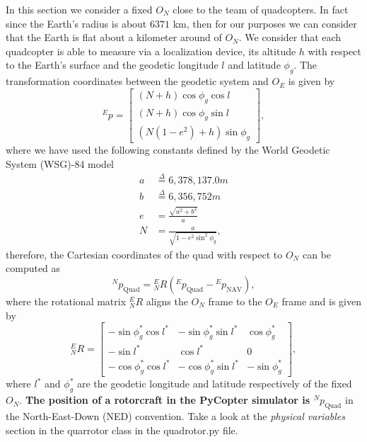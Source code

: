 \documentclass[a4paper, onecolumn]{ieeeconf}
\newcommand{\dfb}{\stackrel{\Delta}{=}}
\begin{document}
In this section we consider a fixed $O_N$ close to the team of quadcopters. In fact since the Earth's radius is about $6371$ km, then for our purposes we can consider that the Earth is flat about a kilometer around of $O_N$. We consider that each quadcopter is able to measure via a localization device, its altitude $h$ with respect to the Earth's surface and the geodetic longitude $l$ and latitude $\phi_g$. The transformation coordinates between the geodetic system and $O_E$ is given by
\begin{equation}
^Ep = \begin{bmatrix}(N+h)\cos{\phi_g}\cos{l} \\
(N+h)\cos{\phi_g}\sin{l} \\
\left(N(1-e^2)+h\right)\sin{\phi_g}\end{bmatrix},
\end{equation}
where we have used the following constants defined by the World Geodetic System (WSG)-84 model \cite{wsg84}
\begin{align}
	a &\dfb 6,378,137.0 m \nonumber \\
	b &\dfb 6,356,752 m \nonumber \\
	e &= \frac{\sqrt{a^2+b^2}}{a} \nonumber \\
	N &= \frac{a}{\sqrt{1-e^2\sin^2{\phi_g}}}, \nonumber
\end{align}
therefore, the Cartesian coordinates of the quad with respect to $O_N$ can be computed as
\begin{equation}
	^Np_{\text{Quad}} = {_N^ER}({^Ep_{\text{Quad}}} - {^Ep_{\text{NAV}}}),
\end{equation}
where the rotational matrix $_N^ER$ aligns the $O_N$ frame to the $O_E$ frame and is given by
\begin{equation}
	_N^ER = \begin{bmatrix}
		-\sin{\phi_g^*} \cos{l^*} & -\sin{\phi_g^*}\sin{l^*} & \cos{\phi^*_g}\\
		-\sin{l^*} & \cos{l^*} & 0 \\
		-\cos{\phi_g^*}\cos{l^*} & -\cos{\phi^*_g}\sin{l^*} & -\sin{\phi_g^*}
	\end{bmatrix}, \nonumber
\end{equation}
where $l^*$ and $\phi_g^*$ are the geodetic longitude and latitude respectively of the fixed $O_N$. {\bf The position of a rotorcraft in the PyCopter simulator is $^Np_{\text{Quad}}$} in the North-East-Down (NED) convention. Take a look at the \emph{physical variables} section in the quarrotor class in the quadrotor.py file.
\end{document}
